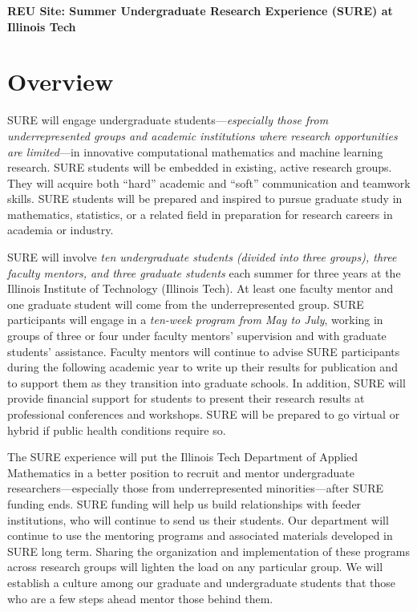 \documentclass[11pt]{NSFamsart}
\begin{document}

\begin{center}
\Large 
\textbf{REU Site: Summer Undergraduate Research Experience (SURE) at Illinois Tech}
\end{center}



\section{Overview} 
SURE will engage undergraduate students---\emph{especially those from underrepresented groups and academic institutions where research opportunities are limited}---in innovative computational mathematics and machine learning research.  SURE students will  be embedded in existing, active research groups. They will acquire both ``hard'' academic and ``soft'' communication and teamwork skills.  SURE students will be prepared and inspired to pursue graduate study in mathematics, statistics, or a related field in preparation for research careers in academia or industry.

SURE will involve \emph{ten undergraduate students (divided into three groups), three faculty mentors, and three graduate students} each summer for three years at the Illinois Institute of Technology (Illinois Tech). At least one faculty mentor and one graduate student will come from the underrepresented group. SURE participants will engage in a \emph{ten-week program from May to July}, working in groups of three or four under faculty mentors' supervision and with graduate students' assistance. Faculty mentors will continue to advise SURE participants during the following academic year to write up their results for publication and to support them as they transition into graduate schools. In addition, SURE will provide financial support for students to present their research results at professional conferences and workshops.
SURE will be prepared to go virtual or hybrid if public health conditions require so.

The SURE experience will put the Illinois Tech Department of Applied Mathematics in a better position to recruit and mentor undergraduate researchers---especially those from underrepresented minorities---after SURE funding ends. SURE funding will help us build relationships with feeder institutions, who will continue to send us their students.  Our department will continue to use the mentoring programs and associated materials developed in SURE long term.  Sharing the organization and implementation of these programs across research groups will lighten the load on any particular group. We will establish a culture among our graduate and undergraduate students that those who are a few steps ahead mentor those behind them.
\end{document}
